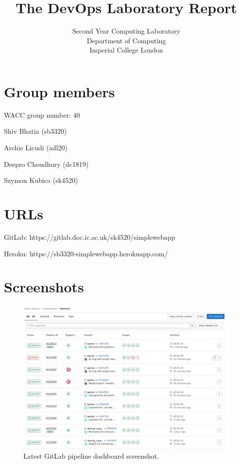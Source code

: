 \documentclass[a4paper]{article}
\begin{document}
\title{The DevOps Laboratory Report}
\date{}
\author{
Second Year Computing Laboratory \\ 
Department of Computing \\ 
Imperial College London
}

\maketitle

\section*{Group members}

WACC group number: 40


Shiv Bhatia (sb3320)

Archie Licudi (adl20)

Deepro Choudhury (dc1819)

Szymon Kubica (sk4520)


\section*{URLs}

GitLab: https://gitlab.doc.ic.ac.uk/sk4520/simplewebapp

Heroku: https://sb3320-simplewebapp.herokuapp.com/

\section*{Screenshots}

\begin{figure}[H]
  \includegraphics[width=\textwidth]{pipeline.png}
  \caption{Latest GitLab pipeline dashboard screenshot.}
\end{figure}
\end{document}
